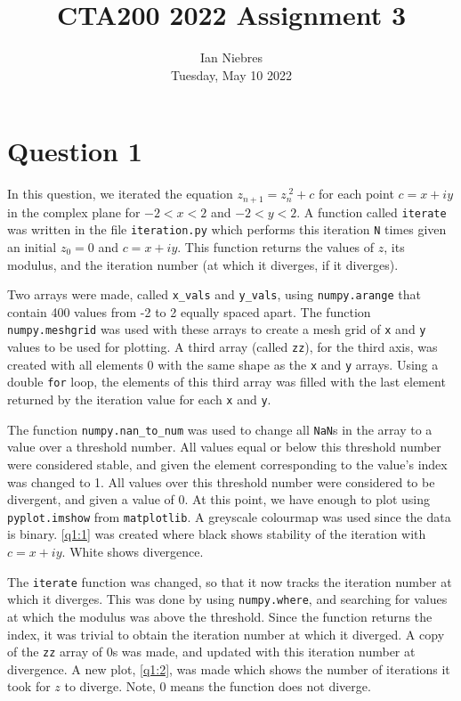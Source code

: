 \documentclass[a4paper,11pt]{article}
\title{CTA200 2022 Assignment 3} %
\author{Ian Niebres\\Tuesday, May 10 2022} %
\date{}
\theoremstyle{plain}
\theoremstyle{definition}
\theoremstyle{remark}
\begin{document}
\maketitle
\section*{Question 1}
\quad\quad In this question, we iterated the equation $z_{n+1} = z_n^{\; 2} + c$ for
each point $c = x+iy$ in the complex plane for $-2 < x < 2$ and 
$-2 < y < 2$. A function called \texttt{iterate} was written
in the file \texttt{iteration.py} which performs this iteration
\texttt{N} times given an initial $z_0 = 0$ and $c = x+iy$.
This function returns the values of $z$, its modulus,
and the iteration number (at which it diverges, if it diverges).

Two
arrays were made, called \texttt{x\_vals} and \texttt{y\_vals},
using \texttt{numpy.arange} that contain 400 values from -2 to 2
equally spaced apart. The function \texttt{numpy.meshgrid}
was used with these arrays to create a
mesh grid of \texttt{x} and \texttt{y} values to be used
for plotting. A third array (called \texttt{zz}), for the third axis, was created
with all elements 0
with the same shape as the \texttt{x} and \texttt{y} arrays.
Using a double \texttt{for} loop, the elements of this third
array was filled with the last element returned by the
iteration value for each \texttt{x} and \texttt{y}.

The function \texttt{numpy.nan\_to\_num} was used to change
all \texttt{NaN}s in the array to a value over a threshold number.
All values equal or below this threshold
number were considered stable, and given the element corresponding
to the value's index was changed to 1. 
All values over this threshold number were considered to be
divergent, and given a value of 0.
At this point, we have enough to plot using \texttt{pyplot.imshow}
from \texttt{matplotlib}. A greyscale colourmap was used since
the data is binary. \cref{q1:1} was created where black shows
stability of the iteration with $c = x+iy$. White shows divergence.

The \texttt{iterate} function was changed, so that it now tracks
the iteration number at which it diverges. This was done by
using \texttt{numpy.where}, and searching for values at which the
modulus was
above the threshold. Since the function returns
the index, it was trivial to obtain the iteration number
at which it diverged. A copy of
the \texttt{zz} array of 0s was made, and updated with
this iteration number at divergence. A new plot, \cref*{q1:2}, was made
which shows the number of iterations it took for $z$ to diverge.
Note, 0 means the function does not diverge.
\end{document}
